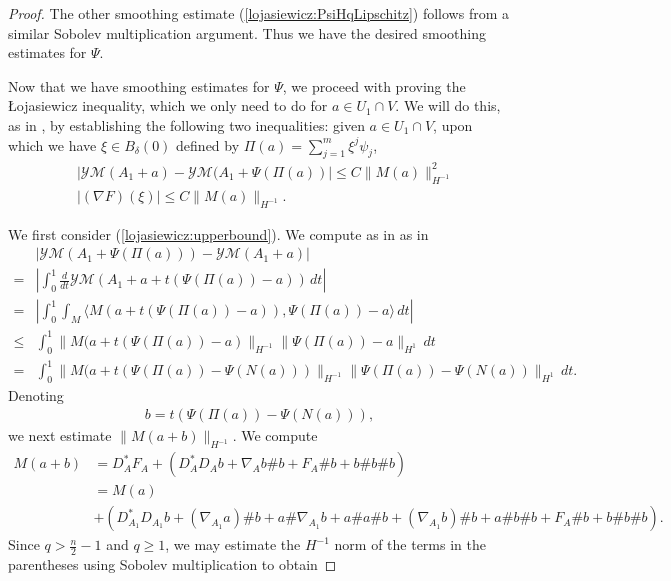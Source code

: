 \documentclass[12pt]{amsart}
\renewcommand{\1}{{\mathbf 1}}
\theoremstyle{others}
\numberwithin{equation}{section}
\begin{document}
\begin{proof}
    The other smoothing estimate (\ref{lojasiewicz:PsiHqLipschitz}) follows from a similar Sobolev multiplication argument. Thus we have the desired smoothing estimates for \(\Psi\). \par 
    Now that we have smoothing estimates for \(\Psi\), we proceed with proving the {\L}ojasiewicz inequality, which %
    we only need to do for \(a \in U_1 \cap V\). We will do this, as in \cite{leonsimon}, by establishing the following two inequalities: given \(a \in U_1 \cap V\), upon which we have \(\xi \in B_{\delta}(0)\) defined by \(\Pi(a) = \sum_{j = 1}^m \xi^j \psi_j\),
    \begin{align}
        &|\mathcal{YM}(A_1 + a) - \mathcal{YM}(A_1 + \Psi(\Pi(a))| \leq C\|M(a)\|_{H^{-1}}^2 \label{lojasiewicz:upperbound} \\
        &|(\nabla F)(\xi)| \leq C\|M(a)\|_{H^{-1}} \label{lojasiewicz:lowerbound}.
    \end{align} \par
    We first consider (\ref{lojasiewicz:upperbound}). We compute as in as in \cite[(2.31)]{leonsimon}
    \begin{align*}
        &|\mathcal{YM}(A_1+\Psi(\Pi(a))) - \mathcal{YM}(A_1 + a)| \\
        = &\left| \int_0^1 \frac{d}{dt}\mathcal{YM}(A_1 + a + t(\Psi(\Pi(a)) - a)) \, dt \right| \\
        = & \left| \int_0^1 \int_M \langle M(a + t(\Psi(\Pi(a)) - a)), \Psi(\Pi(a)) - a\rangle \, dt\right| \\\leq &\int_0^1 \|M(a + t(\Psi(\Pi(a))-a)\|_{H^{-1}} \|\Psi(\Pi(a)) - a\|_{H^1} \, dt \\
        = &\int_0^1 \|M(a + t(\Psi(\Pi(a))-\Psi(N(a)))\|_{H^{-1}} \|\Psi(\Pi(a)) - \Psi(N(a))\|_{H^1} \, dt.
    \end{align*} Denoting
    \begin{align*}
        b = t(\Psi(\Pi(a)) - \Psi(N(a))),
    \end{align*} we next estimate \(\|M(a+b)\|_{H^{-1}}\). We compute
    \begin{align*}
        M(a+b) &= D_A^\ast F_A + (D_A^\ast D_A b + \nabla_A b \# b + F_A \# b + b \# b \# b) \\
        &= M(a) \\
        &+ (D_{A_1}^\ast D_{A_1} b + (\nabla_{A_1} a) \# b + a\#\nabla_{A_1} b + a \# a \# b + (\nabla_{A_1} b) \# b + a \# b \# b + F_A \# b + b \# b \# b).
    \end{align*} Since \(q > \frac{n}{2}-1\) and \(q \geq 1\), we may estimate the \(H^{-1}\) norm of the terms in the parentheses using Sobolev multiplication to obtain

\end{proof}
\end{document}

